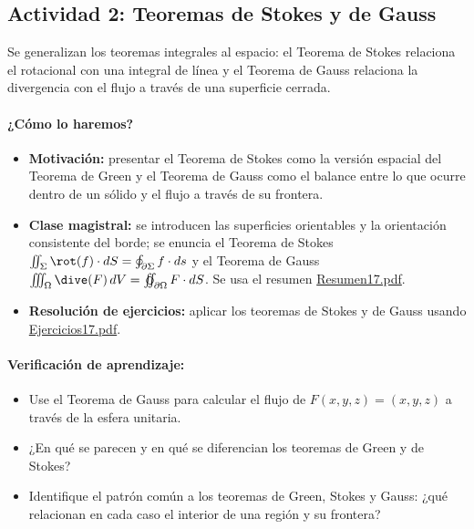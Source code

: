 \documentclass[a4,11pt]{aleph-notas}
\begin{document}
\subsection*{Actividad 2: Teoremas de Stokes y de Gauss}
Se generalizan los teoremas integrales al espacio: el Teorema de Stokes relaciona el rotacional con una integral de línea y el Teorema de Gauss relaciona la divergencia con el flujo a través de una superficie cerrada.

\paragraph{¿Cómo lo haremos?}
\begin{itemize}[leftmargin=*]
    \item \textbf{Motivación:} presentar el Teorema de Stokes como la versión espacial del Teorema de Green y el Teorema de Gauss como el balance entre lo que ocurre dentro de un sólido y el flujo a través de su frontera.
    \item \textbf{Clase magistral:} se introducen las superficies orientables y la orientación consistente del borde; se enuncia el Teorema de Stokes $\iint_\Sigma \rot(f)\cdot dS=\oint_{\partial\Sigma} f\cdot ds$ y el Teorema de Gauss $\iiint_\Omega \dive(F)\,dV=\varoiint_{\partial\Omega} F\cdot dS$. Se usa el resumen \href{https://andres-merino.github.io/MatematicaIII-05-N0051/01Resumen/Resumen17.pdf}{Resumen17.pdf}.
    \item \textbf{Resolución de ejercicios:} aplicar los teoremas de Stokes y de Gauss usando \href{https://andres-merino.github.io/MatematicaIII-05-N0051/04Ejercicios/Ejercicios17.pdf}{Ejercicios17.pdf}.
\end{itemize}

\paragraph{Verificación de aprendizaje:}
\begin{itemize}[leftmargin=*]
    \item Use el Teorema de Gauss para calcular el flujo de $F(x,y,z)=(x,y,z)$ a través de la esfera unitaria.
    \item ¿En qué se parecen y en qué se diferencian los teoremas de Green y de Stokes?
    \item Identifique el patrón común a los teoremas de Green, Stokes y Gauss: ¿qué relacionan en cada caso el interior de una región y su frontera?
\end{itemize}
\end{document}
